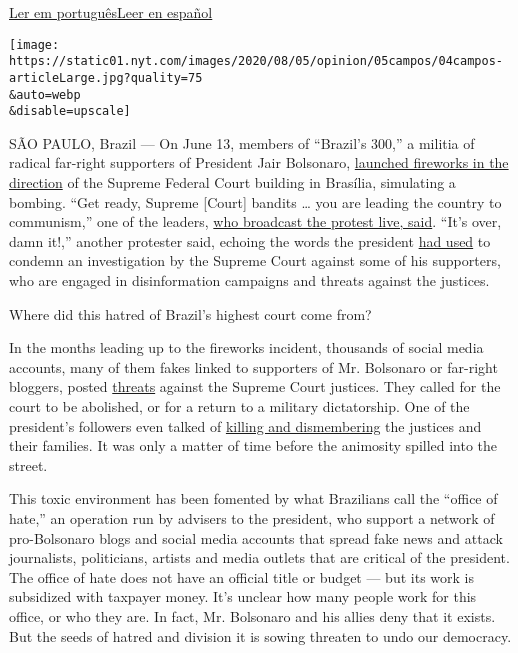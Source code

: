 \href{https://www.nytimes.com/pt/2020/08/04/opinion/international-world/bolsonaro-gabinete-do-odio.html}{Ler
em
português}\href{https://www.nytimes.com/es/2020/08/04/espanol/opinion/bolsonaro-oficina-odio-brasil.html}{Leer
en español}

\texttt{[image: https://static01.nyt.com/images/2020/08/05/opinion/05campos/04campos-articleLarge.jpg?quality=75\\\&auto=webp\\\&disable=upscale]}

SÃO PAULO, Brazil --- On June 13, members of ``Brazil's 300,'' a militia
of radical far-right supporters of President Jair Bolsonaro,
\href{https://www1.folha.uol.com.br/poder/2020/05/sara-winter-xinga-moraes-diz-querer-trocar-socos-com-ele-e-promete-inferniza-lo.shtml}{launched
fireworks in the direction} of the Supreme Federal Court building in
Brasília, simulating a bombing. ``Get ready, Supreme {[}Court{]} bandits
\ldots{} you are leading the country to communism,'' one of the leaders,
\href{https://www.metropoles.com/brasil/video-bolsonaristas-lancam-fogos-de-artificio-em-predio-do-stf}{who
broadcast the protest live, said}. ``It's over, damn it!,'' another
protester said, echoing the words the president
\href{https://www.youtube.com/watch?v=I2bZoC8FHJI}{had used} to condemn
an investigation by the Supreme Court against some of his supporters,
who are engaged in disinformation campaigns and threats against the
justices.

Where did this hatred of Brazil's highest court come from?

In the months leading up to the fireworks incident, thousands of social
media accounts, many of them fakes linked to supporters of Mr. Bolsonaro
or far-right bloggers, posted
\href{https://www1.folha.uol.com.br/poder/2020/05/sara-winter-xinga-moraes-diz-querer-trocar-socos-com-ele-e-promete-inferniza-lo.shtml}{threats}
against the Supreme Court justices. They called for the court to be
abolished, or for a return to a military dictatorship. One of the
president's followers even talked of
\href{https://g1.globo.com/politica/noticia/2020/06/17/moraes-vota-pela-legalidade-e-continuidade-do-inquerito-das-fake-news.ghtml}{killing
and dismembering} the justices and their families. It was only a matter
of time before the animosity spilled into the street.

This toxic environment has been fomented by what Brazilians call the
``office of hate,'' an operation run by advisers to the president, who
support a network of pro-Bolsonaro blogs and social media accounts that
spread fake news and attack journalists, politicians, artists and media
outlets that are critical of the president. The office of hate does not
have an official title or budget --- but its work is subsidized with
taxpayer money. It's unclear how many people work for this office, or
who they are. In fact, Mr. Bolsonaro and his allies deny that it exists.
But the seeds of hatred and division it is sowing threaten to undo our
democracy.

